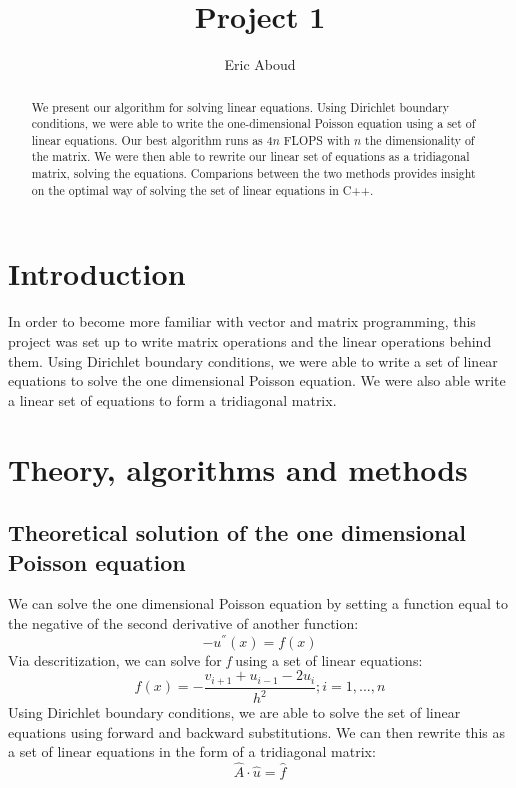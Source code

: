 \documentclass[10pt,showpacs,preprintnumbers,footinbib,amsmath,amssymb,aps,prl,twocolumn,groupedaddress,superscriptaddress,showkeys]{revtex4-1}
\begin{document}
	\title{Project 1}
	\author{Eric Aboud}
	\begin{abstract}
		We present our algorithm for solving linear equations.  Using Dirichlet boundary conditions, we were able to write the one-dimensional Poisson equation using a set of linear equations. Our best algorithm runs as $4n$ FLOPS with $n$ the dimensionality of the matrix.  We were then able to rewrite our linear set of equations as a tridiagonal matrix, solving the equations.  Comparions between the two methods provides insight on the optimal way of solving the set of linear equations in C++.
	\end{abstract}
	\maketitle


	
	
	\section*{Introduction}
	In order to become more familiar with vector and matrix programming, this project was set up to write matrix operations and the linear operations behind them.  Using Dirichlet boundary conditions, we were able to write a set of linear equations to solve the one dimensional Poisson equation.  We were also able write a linear set of equations to form a tridiagonal matrix.
	
	
	
	\section*{Theory, algorithms and methods}
	
	\subsection{Theoretical solution of the one dimensional Poisson equation}
	
	We can solve the one dimensional Poisson equation by setting a function equal to the negative of the second derivative of another function: \begin{equation} -u^{''}(x) = f(x)     \end{equation}  Via descritization, we can solve for {\it f} using a set of linear equations: \begin{equation}
	f(x)=-\frac{v_{i+1}+u_{i-1}-2u_{i}}{h^{2}}      ;      i=1,...,n
	\end{equation}
	Using Dirichlet boundary conditions, we are able to solve the set of linear equations using forward and backward substitutions.  We can then rewrite this as a set of linear equations in the form of a tridiagonal matrix: \begin{equation}	
	\hat{A} \cdot \hat{u} = \hat{f}
	\end{equation}
	
\end{document}
